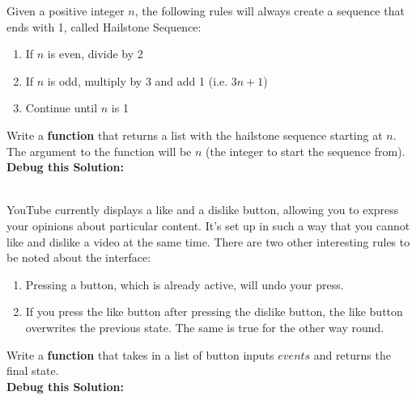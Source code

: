 



	\item 
		Given a positive integer $n$, the following rules will always create a sequence that 
		ends with 1, called Hailstone Sequence:
		\begin{enumerate}
			\item If $n$ is even, divide by 2
			\item If $n$ is odd, multiply by 3 and add 1 (i.e. $3n+1$)
			\item Continue until $n$ is 1
		\end{enumerate}
		Write a \textbf{function} that returns a list with the hailstone sequence starting at $n$. 
		The argument to the function will be $n$ (the integer to start the sequence from).\\

		\textbf{Debug this Solution:}\\
		\mbox{ \hspace*{0.25in}	}

\pagebreak



	\item
		YouTube currently displays a like and a dislike button, allowing you to express your opinions 
		about particular content. 
		It's set up in such a way that you cannot like and dislike a video at the same time.
		There are two other interesting rules to be noted about the interface:
		\begin{enumerate}
			\item Pressing a button, which is already active, will undo your press.
			\item If you press the like button after pressing the dislike button, the like button overwrites 
				the previous  state. The same is true for the other way round.
		\end{enumerate}
		Write a \textbf{function} that takes in a list of button inputs $events$ and returns the final state.\\

		\textbf{Debug this Solution:}\\
		\mbox{ \hspace*{0.25in}	}

